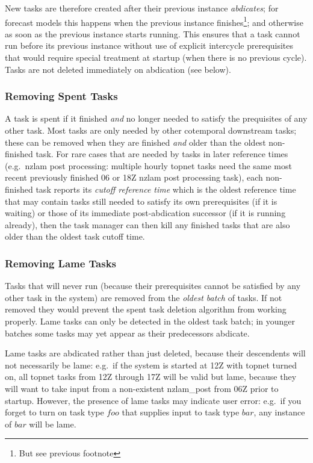 \documentclass[11pt,a4paper]{article}
\begin{document}
New tasks are therefore created after their previous instance {\em
abdicates}; for forecast models this happens when the previous instance
finishes\footnote{But see previous footnote}; and otherwise as soon as
the previous instance starts running. This ensures that a task cannot
run before its previous instance without use of explicit intercycle
prerequisites that would require special treatment at startup (when
there is no previous cycle). Tasks are not deleted immediately on
abdication (see below).

\subsubsection{Removing Spent Tasks} 

A task is spent if it finished {\em and} no longer needed to satisfy the
prequisites of any other task. Most tasks are only needed by other
cotemporal downstream tasks; these can be removed when they are finished
{\em and} older than the oldest non-finished task. For rare cases that
are needed by tasks in later reference times (e.g.\ nzlam post
processing: multiple hourly topnet tasks need the same most recent
previously finished 06 or 18Z nzlam post processing task), each
non-finished task reports its {\em cutoff reference time} which is the
oldest reference time that may contain tasks still needed to satisfy its
own prerequisites (if it is waiting) or those of its immediate
post-abdication successor (if it is running already), then the task
manager can then kill any finished tasks that are also older than the
oldest task cutoff time.

\subsubsection{Removing Lame Tasks} 

Tasks that will never run (because their prerequisites cannot be
satisfied by any other task in the system) are removed from the {\em
oldest batch} of tasks.  If not removed they would prevent the spent
task deletion algorithm from working properly. Lame tasks can only be
detected in the oldest task batch; in younger batches some tasks may yet
appear as their predecessors abdicate.

Lame tasks are abdicated rather than just deleted, because their
descendents will not necessarily be lame: e.g.\ if the system is started
at 12Z with topnet turned on, all topnet tasks from 12Z through 17Z will
be valid but lame, because they will want to take input from a
non-existent nzlam\_post from 06Z prior to startup. However, the
presence of lame tasks may indicate user error: e.g.\ if you forget
to turn on task type $foo$ that supplies input to task type $bar$,
any instance of $bar$ will be lame.
\end{document}
